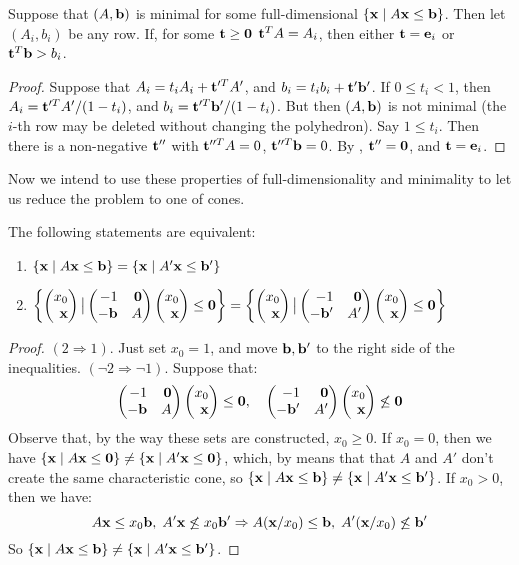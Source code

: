 \begin{Prop}\label{ab_is_minimal}
	Suppose that $(A,\mathbf{b})$ is minimal for some full-dimensional $\left\{\mathbf{x}\;|\; A\mathbf{x}\leq \mathbf{b}\right\}$.  Then let $(A_i,b_i)$ be any row.  If, for some $\mathbf{t}\geq\mathbf{0}$ $\mathbf{t}^TA = A_i$, then either $\mathbf{t}=\mathbf{e}_i$ or $\mathbf{t}^T\mathbf{b} > b_i$.
\end{Prop}

\begin{proof}
	Suppose that $A_i = t_i A_i + \mathbf{t}'^T A'$, and $b_i = t_i b_i + \mathbf{t}'\mathbf{b}'$.  If $0 \leq t_i < 1$, then $A_i = \mathbf{t}'^T A'/(1-t_i)$, and $b_i = \mathbf{t}'^T \mathbf{b}'/(1-t_i)$.  But then $(A,\mathbf{b})$ is not minimal (the $i$-th row may be deleted without changing the polyhedron).  Say $1\leq t_i$.  Then there is a non-negative $\mathbf{t}''$ with $\mathbf{t}''^T A = 0$, $\mathbf{t}''^T\mathbf{b} = 0$.  By , $\mathbf{t}'' = \mathbf{0}$, and $\mathbf{t} = \mathbf{e}_i$.
\end{proof}

Now we intend to use these properties of full-dimensionality and minimality to let us reduce the problem to one of cones.

\begin{Prop}\label{homogenization_cone}
	The following statements are equivalent:
	\begin{enumerate}
		\item $\left\{\mathbf{x}\;|\; A\mathbf{x}\leq \mathbf{b}\right\} = \left\{\mathbf{x}\;|\; A'\mathbf{x}\leq \mathbf{b}'\right\}$
		\item $\set{\xx \big| \pmb -1 & \0 \\ -\b & A \pme \xx \leq \0} =
			      \set{\xx \big| \pmb -1 & \0 \\ -\b' & A' \pme \xx \leq \0}$
	\end{enumerate}
\end{Prop}

\begin{proof}
	$(2 \Rightarrow 1)$.  Just set $x_0 = 1$, and move $\mathbf{b},\mathbf{b}'$ to the right side of the inequalities.
	$(\neg 2 \Rightarrow \neg 1)$.  Suppose that:
	\[ \pmb -1 & \0 \\ -\b & A \pme \xx \leq \0,\quad
		\pmb -1 & \0 \\ -\b' & A' \pme \xx \not\leq \0 \]
	Observe that, by the way these sets are constructed, $x_0 \geq 0$.  If $x_0 = 0$, then we have $\left\{\mathbf{x}\;|\; A\mathbf{x}\leq\mathbf{0}\right\} \neq \left\{\mathbf{x}\;|\; A'\mathbf{x}\leq\mathbf{0}\right\}$, which, by  means that that $A$ and $A'$ don't create the same characteristic cone, so $\left\{\mathbf{x}\;|\; A\mathbf{x}\leq \mathbf{b}\right\} \neq \left\{\mathbf{x}\;|\; A'\mathbf{x}\leq \mathbf{b}'\right\}$.  If $x_0 > 0$, then we have:
	\[ A\mathbf{x} \leq x_0\mathbf{b},\;A'\mathbf{x}\not\leq x_0\mathbf{b}' \Rightarrow A(\mathbf{x}/x_0)\leq\mathbf{b},\;A'(\mathbf{x}/x_0)\not\leq\mathbf{b}' \]
	So $\left\{\mathbf{x}\;|\; A\mathbf{x}\leq \mathbf{b}\right\} \neq \left\{\mathbf{x}\;|\; A'\mathbf{x}\leq \mathbf{b}'\right\}$.
\end{proof}

